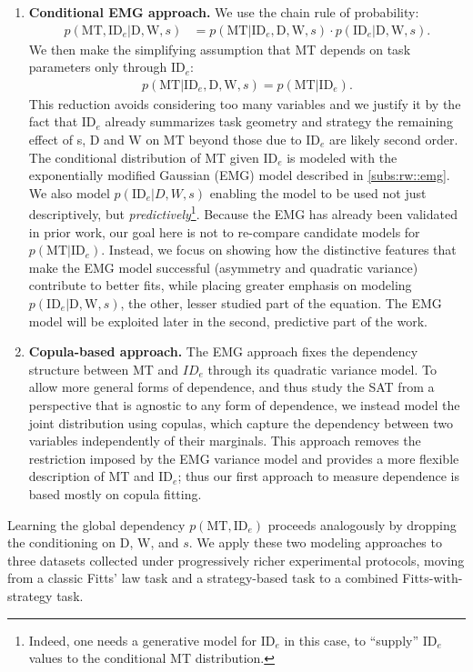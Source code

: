 \documentclass[acmlarge, manuscript,review]{acmart}
\newcommand{\mt}{\ensuremath{{\text{MT}}}\xspace}
\newcommand{\ide}{\ensuremath{{\text{ID}_e}}\xspace}
\newcommand{\D}{\ensuremath{{\text{D}}}\xspace}
\newcommand{\W}{\ensuremath{{\text{W}}}\xspace}
\begin{document}
\begin{enumerate}
  \item \textbf{Conditional EMG approach.}
    We use the chain rule of probability:
    \begin{align}
      p(\mt, \ide | \D, \W, s)
      &= p(\mt | \ide, \D, \W, s) \cdot{} p(\ide | \D, \W, s).\label{eq:chain_rule}
    \end{align}
    We then make the simplifying assumption that MT depends on task parameters only through \ide:
    \begin{align}
      p(\mt | \ide, \D, \W, s) = p(\mt | \ide).
    \end{align}
    This reduction avoids considering too many variables and we justify it by the fact that \ide already summarizes task geometry and strategy \ie the remaining effect of s, \D and \W on MT beyond those due to \ide are likely second order.
    The conditional distribution of MT given \ide is modeled with the exponentially modified Gaussian (EMG) model described in \autoref{subs:rw::emg}.
    We also model \(p(\ide | D, W, s)\) enabling the model to be used not just descriptively, but \textit{predictively}\footnote{Indeed, one needs a generative model for \ide in this case, to ``supply'' \ide values to the conditional MT distribution.}.
    Because the EMG has already been validated in prior work, our goal here is not to re-compare candidate models for $p(\mt|\ide)$. Instead, we focus on showing how the distinctive features that make the EMG model successful (asymmetry and quadratic variance) contribute to better fits, while placing greater emphasis on modeling $p(\ide| \D,\W,s)$, the other, lesser studied part of the equation. The EMG model will be exploited later in the second, predictive part of the work.

  \item \textbf{Copula-based approach.}
    The EMG approach fixes the dependency structure between MT and \(ID_e\) through its quadratic variance model.
    To allow more general forms of dependence, and thus study the SAT from a perspective that is agnostic to any form of dependence, we instead model the joint distribution using copulas, which capture the dependency between two variables independently of their marginals.
    This approach removes the restriction imposed by the EMG variance model and provides a more flexible description of MT and \ide; thus our first approach to measure dependence is based mostly on copula fitting.
\end{enumerate}
\noindent Learning the global dependency \(p(\mt, \ide)\) proceeds analogously by dropping the conditioning on \D, \W, and $s$.
We apply these two modeling approaches to three datasets collected under progressively richer experimental protocols, moving from a classic Fitts' law task and a strategy-based task to a combined Fitts-with-strategy task.
\end{document}
